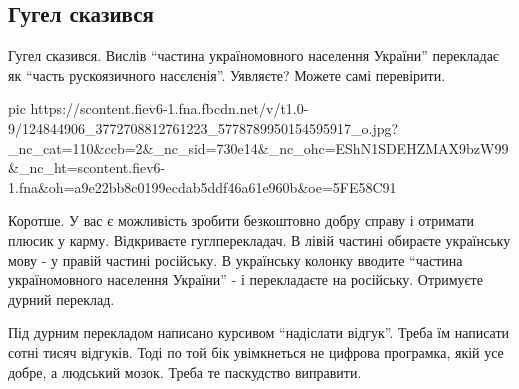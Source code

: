  
 
 
 
 
 
\subsection{Гугел сказився}
\label{sec:12_11_2020.fb.nitsoi_larysa.1.gugel_skaz}

Гугел сказився. Вислів \enquote{частина україномовного населення України} перекладає як
\enquote{часть рускоязичного насєлєнія}. Уявляєте?  Можете самі перевірити. 

\ifcmt
pic https://scontent.fiev6-1.fna.fbcdn.net/v/t1.0-9/124844906_3772708812761223_5778789950154595917_o.jpg?_nc_cat=110&ccb=2&_nc_sid=730e14&_nc_ohc=EShN1SDEHZMAX9bzW99&_nc_ht=scontent.fiev6-1.fna&oh=a9e22bb8c0199ecdab5ddf46a61e960b&oe=5FE58C91
\fi

Коротше. У вас є можливість зробити безкоштовно добру справу і отримати плюсик
у карму. Відкриваєте гуглперекладач. В лівій частині обираєте українську мову -
у правій частині російську. В українську колонку вводите \enquote{частина
україномовного населення України} -  і перекладаєте на російську. Отримуєте
дурний переклад. 

Під дурним перекладом написано курсивом \enquote{надіслати відгук}. Треба їм написати
сотні тисяч відгуків. Тоді по той бік увімкнеться не цифрова програмка, якій
усе добре, а людський мозок. Треба те паскудство виправити.
